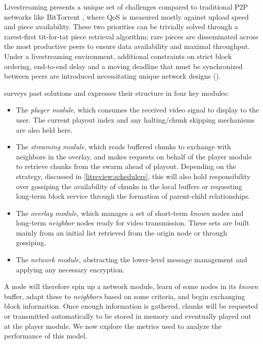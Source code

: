 \documentclass[12pt,a4paper]{article}
\begin{document}
Livestreaming presents a unique set of challenges compared to traditional P2P networks like BitTorrent \cite{Cohen2017}, where QoS is measured mostly against upload speed and piece availability. These two priorities can be trivially solved through a rarest-first tit-for-tat piece retrieval algorithm; rare pieces are disseminated across the most productive peers to ensure data availability and maximal throughput. Under a livestreaming environment, additional constraints on strict block ordering, end-to-end delay and a moving deadline that must be synchronized between peers are introduced necessitating unique network designs (\cite{Liu2008}).

\cite{Friedman2015} surveys past solutions and expresses their structure in four key modules:

\begin{itemize}
	\item The \textit{player module}, which consumes the received video signal to display to the user. The current playout index and any halting/chunk skipping mechanisms are also held here.
	\item The \textit{streaming module}, which reads buffered chunks to exchange with neighbors in the overlay, and makes requests on behalf of the player module to retrieve chunks from the swarm ahead of playout. Depending on the strategy, discussed in \ref{litreview:schedulers}, this will also hold responsibility over gossiping the availability of chunks in the local buffers or requesting long-term block service through the formation of parent-child relationships.
	\item The \textit{overlay module}, which manages a set of short-term \textit{known} nodes and long-term \textit{neighbor} nodes ready for video transmission. These sets are built mainly from an initial list retrieved from the origin node or through gossiping.
	\item The \textit{network module}, abstracting the lower-level message management and applying any necessary encryption.
\end{itemize}

A node will therefore spin up a network module, learn of some nodes in its \textit{known} buffer, adapt these to \textit{neighbors} based on some criteria, and begin exchanging block information. Once enough information is gathered, chunks will be requested or transmitted automatically to be stored in memory and eventually played out at the player module. We now explore the metrics used to analyze the performance of this model.
\end{document}
